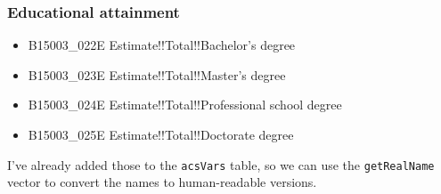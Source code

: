 \documentclass[
  openany]{book}
\providecommand{\tightlist}{%
  \setlength{\itemsep}{0pt}\setlength{\parskip}{0pt}}
\begin{document}
\hypertarget{educational-attainment}{%
\subsubsection*{Educational attainment}\label{educational-attainment}}

\begin{itemize}
\tightlist
\item
  B15003\_022E Estimate!!Total!!Bachelor's degree\\
\item
  B15003\_023E Estimate!!Total!!Master's degree\\
\item
  B15003\_024E Estimate!!Total!!Professional school degree
\item
  B15003\_025E Estimate!!Total!!Doctorate degree
\end{itemize}

I've already added those to the \texttt{acsVars} table, so we can use the \texttt{getRealName} vector to convert the names to human-readable versions.
\end{document}
